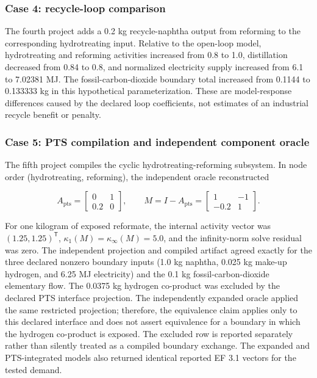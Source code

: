 \documentclass[
  10pt,
  a4paper,
  DIV=11,
  numbers=noendperiod]{scrartcl}
\begin{document}
\subsubsection{Case 4: recycle-loop
comparison}\label{case-4-recycle-loop-comparison}

The fourth project adds a 0.2 kg recycle-naphtha output from reforming
to the corresponding hydrotreating input. Relative to the open-loop
model, hydrotreating and reforming activities increased from 0.8 to 1.0,
distillation decreased from 0.84 to 0.8, and normalized electricity
supply increased from 6.1 to 7.02381 MJ. The fossil-carbon-dioxide
boundary total increased from 0.1144 to 0.133333 kg in this hypothetical
parameterization. These are model-response differences caused by the
declared loop coefficients, not estimates of an industrial recycle
benefit or penalty.

\subsubsection{Case 5: PTS compilation and independent component
oracle}\label{case-5-pts-compilation-and-independent-component-oracle}

The fifth project compiles the cyclic hydrotreating-reforming subsystem.
In node order (hydrotreating, reforming), the independent oracle
reconstructed

\[
A_{\mathrm{pts}}=
\begin{bmatrix}0&1\\0.2&0\end{bmatrix},
\qquad
M=I-A_{\mathrm{pts}}=
\begin{bmatrix}1&-1\\-0.2&1\end{bmatrix}.
\]

For one kilogram of exposed reformate, the internal activity vector was
\((1.25,1.25)^\mathsf{T}\), \(\kappa_1(M)=\kappa_\infty(M)=5.0\), and
the infinity-norm solve residual was zero. The independent projection
and compiled artifact agreed exactly for the three declared nonzero
boundary inputs (1.0 kg naphtha, 0.025 kg make-up hydrogen, and 6.25 MJ
electricity) and the 0.1 kg fossil-carbon-dioxide elementary flow. The
0.0375 kg hydrogen co-product was excluded by the declared PTS interface
projection. The independently expanded oracle applied the same
restricted projection; therefore, the equivalence claim applies only to
this declared interface and does not assert equivalence for a boundary
in which the hydrogen co-product is exposed. The excluded row is
reported separately rather than silently treated as a compiled boundary
exchange. The expanded and PTS-integrated models also returned identical
reported EF 3.1 vectors for the tested demand.
\end{document}
